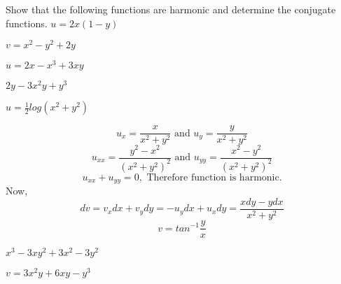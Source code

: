 \begin{problems}
\prob Show that the following functions are harmonic and determine the conjugate functions.  
        \subprob  $u=2x(1-y)$  
        \begin{sol}
        $v=x^2-y^2+2y$
        \end{sol}
        \subprob  $u=2x-x^3+3xy$  
                \begin{sol}
        $2y-3x^2y+y^3$
        \end{sol}
        \subprob  $u = \frac{1}{2} log(x^2+y^2)$  
        \begin{sol}
        \[u_x=\frac{x}{x^2+y^2} \text{ and }u_y=\frac{y}{x^2+y^2} \]
        \[u_{xx}=\frac{y^2-x^2}{(x^2+y^2)^2} \text{ and }u_{yy}=\frac{x^2-y^2}{(x^2+y^2)^2} \]
        \[u_{xx}+u_{yy} = 0 , \text{ Therefore function is harmonic.}\]
        Now,
        \[dv=v_xdx + v_ydy = -u_ydx + u_xdy = \frac{xdy-ydx}{x^2+y^2} \]
        \[v=tan^{-1} \frac{y}{x}\]
        \end{sol}
        \subprob $x^3-3xy^2+3x^2-3y^2$ 
        \begin{sol}
        $v=3x^2y + 6xy - y^3$
        \end{sol}
        

\end{problems}
